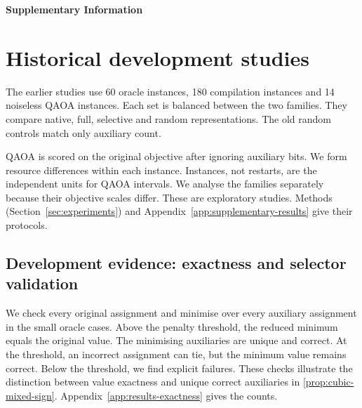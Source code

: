\documentclass[a4paper,onecolumn,11pt,unpublished]{quantumarticle}
\theoremstyle{remark}
\begin{document}
\clearpage
\setcounter{section}{0}\setcounter{subsection}{0}
\setcounter{equation}{0}\setcounter{figure}{0}\setcounter{table}{0}
\setcounter{algorithm}{0}
\renewcommand{\thesection}{S\arabic{section}}
\renewcommand{\theequation}{S\arabic{equation}}
\renewcommand{\thefigure}{S\arabic{figure}}
\renewcommand{\thetable}{S\arabic{table}}
\renewcommand{\thealgorithm}{S\arabic{algorithm}}
\renewcommand{\figurename}{Supplementary Figure}
\renewcommand{\tablename}{Supplementary Table}
\renewcommand{\theHsection}{supp.\arabic{section}}
\renewcommand{\theHequation}{supp.\arabic{equation}}
\renewcommand{\theHfigure}{supp.\arabic{figure}}
\renewcommand{\theHtable}{supp.\arabic{table}}
\renewcommand{\theHalgorithm}{supp.\arabic{algorithm}}
\begin{center}\Large\bfseries Supplementary Information\end{center}
\section{Historical development studies}\label{supp:historical}
The earlier studies use 60 oracle instances, 180 compilation instances and
14 noiseless QAOA instances. Each set is balanced between the two families.
They compare native, full, selective and random representations.
The old random controls match only auxiliary count.

QAOA is scored on the original objective after ignoring auxiliary bits.
We form resource differences within each instance.
Instances, not restarts, are the independent units for QAOA intervals.
We analyse the families separately because their objective scales differ.
These are exploratory studies.
Methods (Section~\ref{sec:experiments}) and
Appendix~\ref{app:supplementary-results} give their protocols.

\subsection{Development evidence: exactness and selector validation}
\label{sec:results-exactness}
\label{sec:results-selector-validation}

We check every original assignment and minimise over every auxiliary
assignment in the small oracle cases. Above the penalty threshold,
the reduced minimum equals the original value. The minimising auxiliaries
are unique and correct. At the threshold, an incorrect assignment can tie,
but the minimum value remains correct. Below the threshold, we find
explicit failures. These checks illustrate the distinction between
value exactness and unique correct auxiliaries in
\cref{prop:cubic-mixed-sign}.
Appendix~\ref{app:results-exactness} gives the counts.
\end{document}
